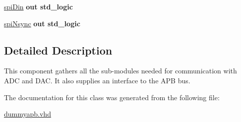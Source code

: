 \begin{DoxyCompactItemize}
\item 
\hypertarget{classdummyapb_a77f854eda2e8d157ccc5d2d08e8ecfb7}{\hyperlink{classdummyapb_a77f854eda2e8d157ccc5d2d08e8ecfb7}{spi\-Din}  {\bfseries {\bfseries \textcolor{vhdlkeyword}{out}\textcolor{vhdlchar}{ }}} {\bfseries \textcolor{comment}{std\-\_\-logic}\textcolor{vhdlchar}{ }} }\label{classdummyapb_a77f854eda2e8d157ccc5d2d08e8ecfb7}

\item 
\hypertarget{classdummyapb_ae9d5788ea215a9d9dd1b8b43e977d582}{\hyperlink{classdummyapb_ae9d5788ea215a9d9dd1b8b43e977d582}{spi\-Nsync}  {\bfseries {\bfseries \textcolor{vhdlkeyword}{out}\textcolor{vhdlchar}{ }}} {\bfseries \textcolor{comment}{std\-\_\-logic}\textcolor{vhdlchar}{ }} }\label{classdummyapb_ae9d5788ea215a9d9dd1b8b43e977d582}

\end{DoxyCompactItemize}


\subsection{Detailed Description}
This component gathers all the sub-\/modules needed for communication with A\-D\-C and D\-A\-C. It also supplies an interface to the A\-P\-B bus. 

The documentation for this class was generated from the following file\-:\begin{DoxyCompactItemize}
\item 
\hyperlink{dummyapb_8vhd}{dummyapb.\-vhd}\end{DoxyCompactItemize}

